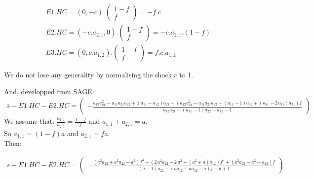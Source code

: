 \documentclass[12pt,a4paper]{article}
\begin{document}
\begin{gather*}
E1.HC = \left(0,-c\right).\left(\begin{matrix}1-f\\f\end{matrix}\right)=-f.c
\\
E2.HC=\left(-c.a_{2,1},0\right).\left(\begin{matrix}1-f\\f\end{matrix}\right)=-c.a_{2,1}.\left(1-f\right)
\\ 
E3.HC=\left(0,c.a_{1,2}\right).\left(\begin{matrix}1-f\\f\end{matrix}\right)=f.c.a_{1,2}
\end{gather*}

We do not lose any generality by normalising the shock $c$ to 1. 

And, developped from SAGE:
\begin{gather}
\bar{s}-E1.HC-E2.HC=\left(\begin{array}{r}
-\frac{a_{12} a_{21}^{2} - a_{11} a_{21} a_{22} + {\left(a_{11} - a_{12}\right)} a_{21} - {\left(a_{12} a_{21}^{2} - a_{11} a_{21} a_{22} - {\left(a_{11} - 1\right)} a_{12} + {\left(a_{11} - 2 \, a_{12}\right)} a_{21}\right)} f}{a_{12} a_{21} - {\left(a_{11} - 1\right)} a_{22} + a_{11} - 1}
\end{array}\right)
\end{gather}
We assume that:
$\frac{a_{1,1}}{a_{2,1}}=\frac{1-f}{f}$ and $a_{1,1}+a_{2,1}=a$. \\ 
So
$a_{1,1}=(1-f)a$ and $a_{2,1}=fa$. \\

Then:

\begin{gather}
\bar{s}-E1.HC-E2.HC=\left(\begin{array}{r}
-\frac{{\left(a^{2} a_{12} + a^{2} a_{22} - a^{2}\right)} f^{3} - {\left(2 \, a^{2} a_{22} - 2 \, a^{2} + {\left(a^{2} + a\right)} a_{12}\right)} f^{2} + {\left(a^{2} a_{22} - a^{2} + a_{12}\right)} f}{{\left(a - 1\right)} a_{22} - {\left(a a_{12} + a a_{22} - a\right)} f - a + 1}
\end{array}\right)
\end{gather}
\end{document}
